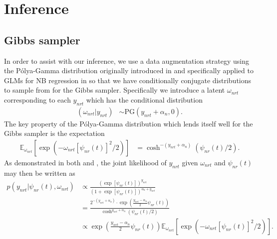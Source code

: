 \documentclass[11pt]{article}
\newcommand{\1}{\mathbf{1}}
\newcommand{\0}{\mathbf{0}}
\begin{document}
\section{Inference}\label{Inference}

\subsection{Gibbs sampler}

In order to assist with our inference, we use a data augmentation strategy using the P\'{o}lya-Gamma distribution originally introduced in \cite{PG} and specifically applied to GLMs for NB regression in \cite{NBregression} so that we have conditionally conjugate distributions to sample from for the Gibbs sampler. Specifically we introduce a latent $\omega_{nrt}$ corresponding to each $y_{nrt}$ which has the conditional distribution
%
%
%
\begin{align*}
	(\omega_{nrt} | y_{nrt}) &\sim \text{PG}(y_{nrt} + \alpha_{n}, 0).
\end{align*}
%
%
%
The key property of the P\'{o}lya-Gamma distribution which lends itself well for the Gibbs sampler is the expectation 
%
%
%
\begin{align*}
	\mathbb{E}_{\omega_{nrt}}\left[ \exp\left( -\omega_{nrt}\left[ \psi_{nr}(t) \right]^2 / 2 \right) \right] &= \cosh^{-(y_{nrt} + \alpha_{n})}(\psi_{nr}(t) / 2).
\end{align*}
%
%
%
As demonstrated in both \cite{PG} and \cite{NBregression}, the joint likelihood of $y_{nrt}$ given $\omega_{nrt}$ and $\psi_{nr}(t)$ may then be written as
%
%
%
\begin{align*}
	p(y_{nrt} | \psi_{nr}(t), \omega_{nrt}) &\propto \frac{ \left( \exp\left[ \psi_{nr}(t) \right] \right)^{y_{nrt}}}{\left( 1 +  \exp\left[ \psi_{nr}(t) \right] \right)^{\alpha_{n} + y_{nrt}}} \\
	&= \frac{2^{-(y_{nrt} + \alpha_{n})} \cdot \exp\left( \frac{y_{nrt} - \alpha_{n}}{2} \psi_{nr}(t) \right)}{\cosh^{y_{nrt} + \alpha_{n}}(\psi_{nr}(t) / 2)} \\
	&\propto \exp\left( \frac{y_{nrt} - \alpha_{n}}{2} \psi_{nr}(t) \right) \mathbb{E}_{\omega_{nrt}}\left[ \exp\left( -\omega_{nrt}\left[ \psi_{nr}(t) \right]^2 / 2 \right) \right].
\end{align*}
%
%
%
\end{document}
